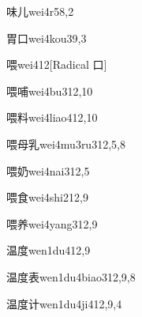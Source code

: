 \begin{verbete}{味儿}{wei4r5}{8,2}
\end{verbete}

\begin{verbete}{胃口}{wei4kou3}{9,3}
\end{verbete}

\begin{verbete}{喂}{wei4}{12}[Radical 口]
\end{verbete}

\begin{verbete}{喂哺}{wei4bu3}{12,10}
\end{verbete}

\begin{verbete}{喂料}{wei4liao4}{12,10}
\end{verbete}

\begin{verbete}{喂母乳}{wei4mu3ru3}{12,5,8}
\end{verbete}

\begin{verbete}{喂奶}{wei4nai3}{12,5}
\end{verbete}

\begin{verbete}{喂食}{wei4shi2}{12,9}
\end{verbete}

\begin{verbete}{喂养}{wei4yang3}{12,9}
\end{verbete}

\begin{verbete}{温度}{wen1du4}{12,9}
\end{verbete}

\begin{verbete}{温度表}{wen1du4biao3}{12,9,8}
\end{verbete}

\begin{verbete}{温度计}{wen1du4ji4}{12,9,4}
\end{verbete}

